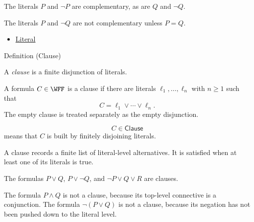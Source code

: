 \begin{remark*}[Examples]
The literals \(P\) and \(\neg P\) are complementary, as are \(Q\) and
\(\neg Q\).
\end{remark*}

\begin{remark*}
The literals \(P\) and \(\neg Q\) are not complementary unless \(P=Q\).
\end{remark*}

\begin{dependencies}
\begin{itemize}
  \item \hyperref[def:literal-propositional-logic]{Literal}
\end{itemize}
\end{dependencies}

\begin{definitionbox}{Definition (Clause)}
\begin{definition}[Clause]
\label{def:clause-propositional-logic}
A \emph{clause} is a finite disjunction of literals.
\end{definition}
\end{definitionbox}

\begin{remark*}
A formula \(C\in\WFF\) is a clause if there are literals
\(\ell_1,\ldots,\ell_n\) with \(n\ge 1\) such that
\[
C=\ell_1\lor\cdots\lor\ell_n.
\]
The empty clause is treated separately as the empty disjunction.
\end{remark*}

\begin{remark*}
\[
C\in\mathsf{Clause}
\]
means that \(C\) is built by finitely disjoining literals.
\end{remark*}

\begin{remark*}[Interpretation]
A clause records a finite list of literal-level alternatives. It is satisfied
when at least one of its literals is true.
\end{remark*}

\begin{remark*}[Examples]
The formulas \(P\lor Q\), \(P\lor\neg Q\), and
\(\neg P\lor Q\lor R\) are clauses.
\end{remark*}

\begin{remark*}
The formula \(P\land Q\) is not a clause, because its top-level connective is a
conjunction. The formula \(\neg(P\lor Q)\) is not a clause, because its negation
has not been pushed down to the literal level.
\end{remark*}

